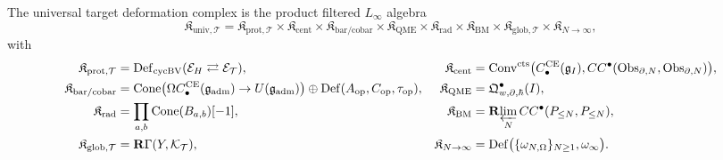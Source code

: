 \begin{defn}
\label{def:completion-universal-deformation-complex}
The universal target deformation complex is the product filtered
\(L_\infty\) algebra
\[
  \mathfrak K_{\mathrm{univ},\mathcal T}
  =\mathfrak K_{\mathrm{prot},\mathcal T}
   \times\mathfrak K_{\mathrm{cent}}
   \times\mathfrak K_{\mathrm{bar/cobar}}
   \times\mathfrak K_{\mathrm{QME}}
   \times\mathfrak K_{\mathrm{rad}}
   \times\mathfrak K_{\mathrm{BM}}
   \times\mathfrak K_{\mathrm{glob},\mathcal T}
   \times\mathfrak K_{N\to\infty},
\]
with
\begin{align*}
  \mathfrak K_{\mathrm{prot},\mathcal T}
   &=\mathrm{Def}_{\mathrm{cycBV}}(\mathcal E_H\rightleftarrows\mathcal E_{\mathcal T}),
   &
  \mathfrak K_{\mathrm{cent}}
   &=\mathrm{Conv}^{\mathrm{cts}}\bigl(C^{\mathrm{CE}}_\bullet(\mathfrak g_I),
     CC^\bullet(\mathrm{Obs}_{\partial,N},\mathrm{Obs}_{\partial,N})\bigr),\\
  \mathfrak K_{\mathrm{bar/cobar}}
   &=\mathrm{Cone}\bigl(\Omega C^{\mathrm{CE}}_\bullet(\mathfrak g_{\mathrm{adm}})
     \to U(\mathfrak g_{\mathrm{adm}})\bigr)\oplus
     \mathrm{Def}(A_{\mathrm{op}},C_{\mathrm{op}},\tau_{\mathrm{op}}),
   &
  \mathfrak K_{\mathrm{QME}}
   &=\mathfrak Q^\bullet_{w,\partial,\hbar}(I),\\
  \mathfrak K_{\mathrm{rad}}
   &=\prod_{a,b}\mathrm{Cone}(B_{a,b})[-1],
   &
  \mathfrak K_{\mathrm{BM}}
   &=\mathbf R\!\varprojlim_N CC^\bullet(P_{\le N},P_{\le N}),\\
  \mathfrak K_{\mathrm{glob},\mathcal T}
   &=\mathbf R\Gamma(Y,\mathcal K_{\mathcal T}),
   &
  \mathfrak K_{N\to\infty}
   &=\mathrm{Def}\bigl(\{\omega_{N,\Omega}\}_{N\ge 1},\omega_\infty\bigr).
\end{align*}
\end{defn}

